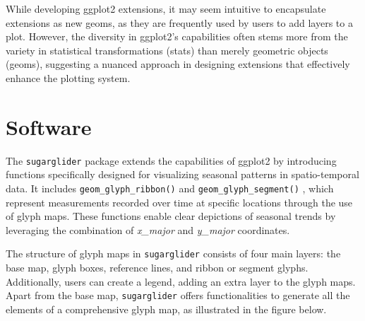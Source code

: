 While developing ggplot2 extensions, it may seem intuitive to encapsulate extensions as new geoms, as they are frequently used by users to add layers to a plot. However, the diversity in ggplot2's capabilities often stems more from the variety in statistical transformations (stats) than merely geometric objects (geoms), suggesting a nuanced approach in designing extensions that effectively enhance the plotting system.

\section{Software}\label{software}

The \texttt{sugarglider} package extends the capabilities of ggplot2 by introducing functions specifically designed for visualizing seasonal patterns in spatio-temporal data. It includes \texttt{geom\_glyph\_ribbon()} and \texttt{geom\_glyph\_segment()} , which represent measurements recorded over time at specific locations through the use of glyph maps. These functions enable clear depictions of seasonal trends by leveraging the combination of \emph{x\_major} and \emph{y\_major} coordinates.

The structure of glyph maps in \texttt{sugarglider} consists of four main layers: the base map, glyph boxes, reference lines, and ribbon or segment glyphs. Additionally, users can create a legend, adding an extra layer to the glyph maps. Apart from the base map, \texttt{sugarglider} offers functionalities to generate all the elements of a comprehensive glyph map, as illustrated in the figure below.

